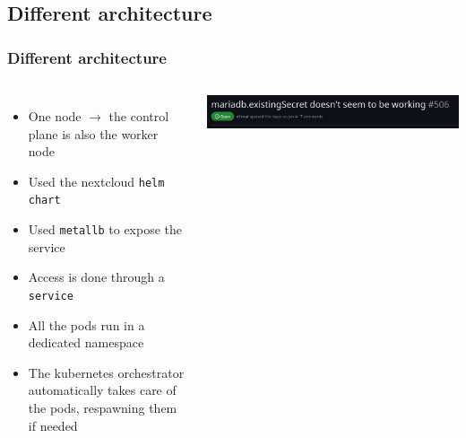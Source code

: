\documentclass{beamer}
\let\oldtexttt\texttt
\renewcommand{\texttt}[1]{\textcolor{textttcolor}{\oldtexttt{#1}}}
\begin{document}
\subsection{Different architecture}
\begin{frame}
    \frametitle{Different architecture}
    \begin{columns}
        \begin{itemize}
            \item One node $\rightarrow$  the control plane is also the worker node
            \item Used the nextcloud \texttt{helm chart}
            \item Used \texttt{metallb} to expose the service
            \item Access is done through a \texttt{service}
            \item All the pods run in a dedicated namespace
            \item The kubernetes orchestrator automatically takes care of the pods, respawning them if needed
        \end{itemize}
        
        \vspace{4em}
        \includegraphics[width=\textwidth]{images/other/githubissue}


\end{columns}
\end{frame}
\end{document}
